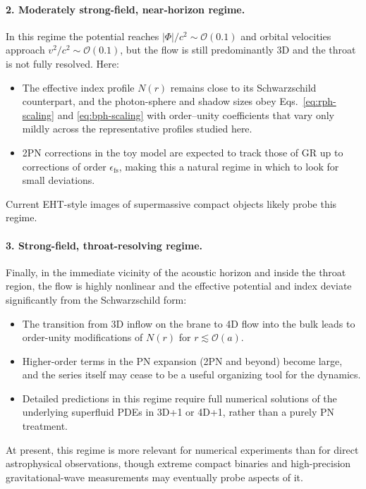 \documentclass[11pt]{article}
\begin{document}
\paragraph{2. Moderately strong-field, near-horizon regime.}
In this regime the potential reaches \(|\Phi|/c^2 \sim \mathcal{O}(0.1)\)
and orbital velocities approach \(v^2/c^2 \sim \mathcal{O}(0.1)\), but the
flow is still predominantly 3D and the throat is not fully resolved.  Here:
\begin{itemize}
  \item The effective index profile \(N(r)\) remains close to its
        Schwarzschild counterpart, and the photon-sphere and shadow sizes
        obey Eqs.~\eqref{eq:rph-scaling} and \eqref{eq:bph-scaling} with
        order--unity coefficients that vary only mildly across the
        representative profiles studied here.
  \item 2PN corrections in the toy model are expected to track those of GR
        up to corrections of order \(\epsilon_{\text{fs}}\), making this a
        natural regime in which to look for small deviations.
\end{itemize}
Current EHT-style images of supermassive compact objects likely probe this
regime.

\paragraph{3. Strong-field, throat-resolving regime.}
Finally, in the immediate vicinity of the acoustic horizon and inside the
throat region, the flow is highly nonlinear and the effective potential and
index deviate significantly from the Schwarzschild form:
\begin{itemize}
  \item The transition from 3D inflow on the brane to 4D flow into the bulk
        leads to order-unity modifications of \(N(r)\) for \(r \lesssim
        \mathcal{O}(a)\).
  \item Higher-order terms in the PN expansion (2PN and beyond) become
        large, and the series itself may cease to be a useful organizing
        tool for the dynamics.
  \item Detailed predictions in this regime require full numerical solutions
        of the underlying superfluid PDEs in 3D+1 or 4D+1, rather than a
        purely PN treatment.
\end{itemize}
At present, this regime is more relevant for numerical experiments than for
direct astrophysical observations, though extreme compact binaries and
high-precision gravitational-wave measurements may eventually probe aspects
of it.
\end{document}
